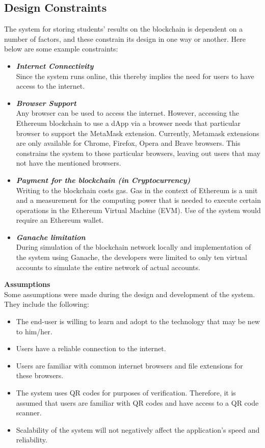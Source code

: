 \subsection{Design Constraints}
The system for storing students' results on the blockchain is dependent on a number of factors, and these constrain its design in one way or another. Here below are some example constraints: 
\begin{itemize}
\item \textbf{\textit{Internet Connectivity}}\\
Since the system runs online, this thereby implies the need for users to have access to the internet.
\item \textbf{\textit{Browser Support}}\\
Any browser can be used to access the internet. However, accessing the Ethereum blockchain to use a dApp via a browser needs that particular browser to support the MetaMask extension. Currently, Metamask extensions are only available for Chrome, Firefox, Opera and Brave browsers. This constrains the system to these particular browsers, leaving out users that may not have the mentioned browsers.
\item \textbf{\textit{Payment for the blockchain (in Cryptocurrency)}}\\
Writing to the blockchain costs gas. Gas in the context of Ethereum is a unit and a measurement for the computing power that is needed to execute certain operations in the Ethereum Virtual Machine (EVM). Use of the system would require an Ethereum wallet\cite{art19}.
\item \textbf{\textit{Ganache limitation}}\\
During simulation of the blockchain network locally and implementation of the system using Ganache, the developers were limited to only ten virtual accounts to simulate the entire network of actual accounts.
\end{itemize}
\textbf{Assumptions}\\
Some assumptions were made during the design and development of the system. They include the following:\\
\begin{itemize}
\item The end-user is willing to learn and adopt to the technology that may be new to him/her.
\item Users have a reliable connection to the internet.
\item Users are familiar with common internet browsers and file extensions for these browsers.
\item The system uses QR codes for purposes of verification. Therefore, it is assumed that users are familiar with QR codes and have access to a QR code scanner.
\item Scalability of the system will not negatively affect the application’s speed and reliability.
\end{itemize}

